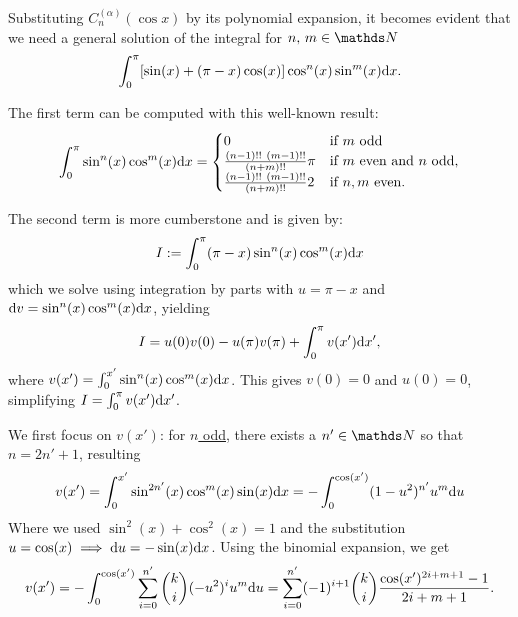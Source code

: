 Substituting $C_n^{(\alpha)}(\cos x)$ by its polynomial expansion, it becomes evident that we need a general solution of the integral for $n,\,m \in \Naturals$
\begin{equation}
\int_0^\pi \left[ \sin(x) + (\pi - x) \cos(x) \right] \cos^n(x) \sin^m(x) \calcd{x}.
\end{equation}

The first term can be computed with this well-known result:
\begin{equation}
    \int_0^{\pi} \sin^n(x) \cos^m(x) \calcd{x} =
    \begin{cases}
        0                                   & \text{if}\ m\ \text{odd}\\
        \frac{(n-1)!!~(m-1)!!}{(n+m)!!} \pi & \text{if}\ m\ \text{even and }n\ \text{odd},\\
        \frac{(n-1)!!~(m-1)!!}{(n+m)!!} 2   & \text{if}\ n,m\ \text{even}.
    \end{cases}
\end{equation}

The second term is more cumberstone and is given by:
\begin{equation}
    I := \int_0^{\pi} (\pi - x) \sin^n(x) \cos^m(x) \mathrm{d}{x}
\end{equation}
which we solve using integration by parts with $u = \pi - x$ and $\mathrm{d}{v} = \sin^n(x) \cos^m(x) \mathrm{d}{x}$, yielding
\begin{equation}
    I = u(0) v(0) - u(\pi) v(\pi) + \int_0^{\pi} v(x') \mathrm{d}{x'},
\end{equation}
where $v(x') = \int_0^{x'} \sin^n(x) \cos^m(x) \mathrm{d}{x}$. This gives $v(0) = 0$ and $u(0) = 0$, simplifying $I = \int_0^\pi v(x') \mathrm{d}{x'}$.

We first focus on $v(x')$:
for \underline{$n$ odd}, there exists a $n' \in \Naturals$ so that $n = 2n' + 1$, resulting
\begin{equation}
    v(x') = \int_0^{x'} \sin^{2n'}(x) \cos^m(x) \sin(x) \mathrm{d}{x}
          = -\int_0^{\cos(x')} (1 - u^2)^{n'} u^m \mathrm{d}{u}
\end{equation}
Where we used $\sin^2(x) + \cos^2(x) = 1$ and the substitution $u = \cos(x) \implies \mathrm{d}{u} = - \sin(x) \mathrm{d}{x}$. Using the binomial expansion, we get
\begin{equation}
    v(x') = -\int_0^{\cos(x')} \sum_{i=0}^{n'} \binom{k}{i} (-u^2)^i u^m \mathrm{d}{u} 
    = \sum_{i=0}^{n'} (-1)^{i+1} \binom{k}{i} \frac{\cos(x')^{2i+m+1} - 1}{2i+m+1}.
\end{equation}

